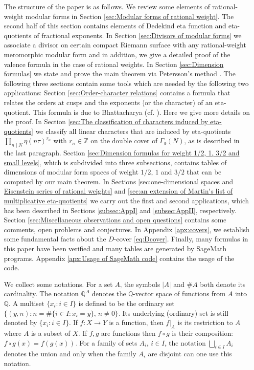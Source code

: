 \documentclass[12pt]{amsart}
\numberwithin{equation}{section}
\theoremstyle{plain}
\theoremstyle{definition}
\theoremstyle{remark}
\newcommand*\abs[1]{\lvert#1\rvert}
\newcommand\numZ{\mathbb{Z}}
\newcommand\numQ{\mathbb{Q}}
\begin{document}
The structure of the paper is as follows. We review some elements of rational-weight modular forms in Section \ref{sec:Modular forms of rational weight}. The second half of this section contains elements of Dedekind eta function and eta-quotients of fractional exponents. In Section \ref{sec:Divisors of modular forms} we associate a divisor on certain compact Riemann surface with any rational-weight meromorphic modular form and in addition, we give a detailed proof of the valence formula in the case of rational weights. In Section \ref{sec:Dimension formulas} we state and prove the main theorem via Petersson's method \cite{Pet38}. The following three sections contain some tools which are needed by the following two applications: Section \ref{sec:Order-character relations} contains a formula that relates the orders at cusps and the exponents (or the character) of an eta-quotient. This formula is due to Bhattacharya (cf. \cite[Eq. (5.13)]{Bha17}). Here we give more details on the proof. In Section \ref{sec:The classification of characters induced by eta-quotients} we classify all linear characters that are induced by eta-quotients $\prod_{n\mid N}\eta(n\tau)^{r_n}$ with $r_n\in\numZ$ on the double cover of $\Gamma_0(N)$, as is described in the last paragraph. Section \ref{sec:Dimension formulas for weight 1/2, 1, 3/2 and small levels}, which is subdivided into three subsections, contains tables of dimensions of modular form spaces of weight $1/2$, $1$ and $3/2$ that can be computed by our main theorem. In Sections \ref{sec:one-dimensional spaces and Eisenstein series of rational weights} and \ref{sec:an extension of Martin's list of multiplicative eta-quotients} we carry out the first and second applications, which has been described in Sections \ref{subsec:AppI} and \ref{subsec:AppII}, respectively. Section \ref{sec:Miscellaneous observations and open questions} contains some comments, open problems and conjectures. In Appendix \ref{apx:covers}, we establish some fundamental facts about the $D$-cover \eqref{eq:Dcover}. Finally, many formulas in this paper have been verified and many tables are generated by SageMath \cite{Sage} programs. Appendix \ref{apx:Usage of SageMath code} contains the usage of the code.

We collect some notations. For a set $A$, the symbols $\abs{A}$ and $\#A$ both denote its cardinality. The notation $\numQ^A$ denotes the $\numQ$-vector space of functions from $A$ into $\numQ$. A multiset $\{x_i\colon i\in I\}$ is defined to be the ordinary set $\{(y,n)\colon n=\#\{i\in I\colon x_i=y\},\,n\neq0\}$. Its underlying (ordinary) set is still denoted by $\{x_i\colon i\in I\}$. If $f\colon X\rightarrow Y$ is a function, then $f\vert_A$ is its restriction to $A$ where $A$ is a subset of $X$. If $f,g$ are functions then $f\circ g$ is their composition: $f\circ g(x)=f(g(x))$. For a family of sets $A_i$, $i\in I$, the notation $\bigsqcup_{i\in I}A_i$ denotes the union and only when the family $A_i$ are disjoint can one use this notation.
\end{document}
